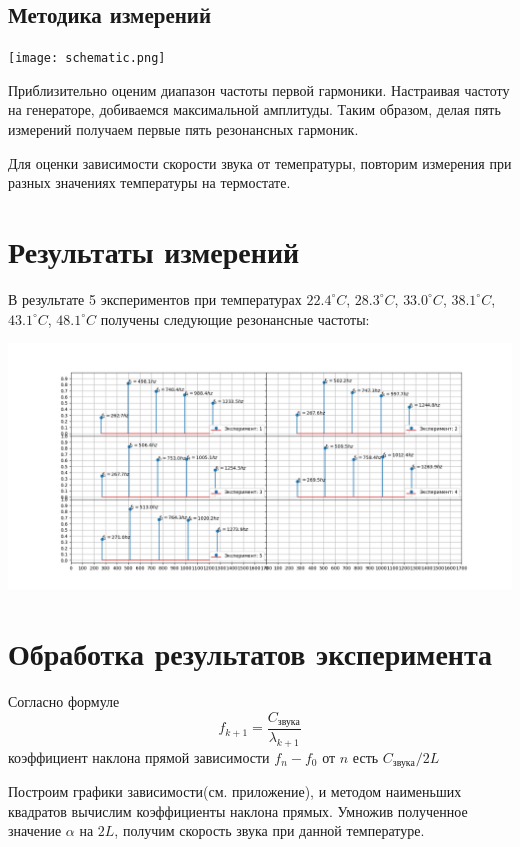 \documentclass{article}
\begin{document}
\subsection{Методика измерений}
\begin{center}
    \texttt{[image: schematic.png]}
\end{center}

Приблизительно оценим диапазон частоты первой гармоники. Настраивая частоту на генераторе, добиваемся максимальной амплитуды. Таким образом, делая пять измерений получаем первые пять резонансных гармоник.

Для оценки зависимости скорости звука от темепратуры, повторим измерения при разных значениях температуры на термостате.
\section{Результаты измерений}

В результате 5 экспериментов при температурах $22.4^\circ C$, $28.3^\circ C$,
$33.0^\circ C$, $38.1^\circ C$, $43.1^\circ C$, $48.1^\circ C$ получены следующие резонансные частоты:
\begin{center}
    \includegraphics[scale = 0.3]{expResults.png}
\end{center}
\section{Обработка результатов эксперимента}

Согласно формуле 
\begin{equation}
    f_{k+1} = \frac{C_{\text{звука}}}{\lambda_{k+1}}
\end{equation}
коэффициент наклона прямой зависимости $f_{n}-f_{0}$ от $n$ есть $C_{\text{звука}}/2L$

Построим графики зависимости(см. приложение), и методом наименьших квадратов вычислим коэффициенты наклона прямых. Умножив полученное значение $\alpha$ на $2L$, получим скорость звука при данной температуре.
\end{document}
